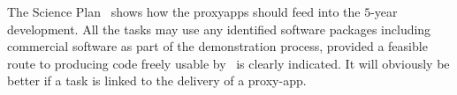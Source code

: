 The Science Plan~\cite{sciplan} shows how the proxyapps should feed into the $5$-year development.
All the tasks may use any identified software packages including
commercial software as part of the demonstration process, provided a feasible route to producing code
freely usable by \nep \  is clearly indicated. It will obviously be better if a task
is linked to the delivery of a proxy-app.



